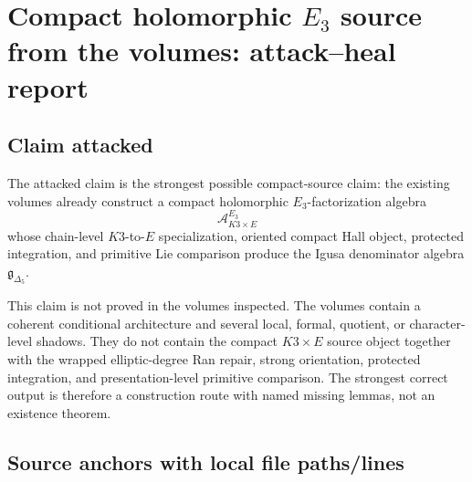 \providecommand{\Ran}{\mathrm{Ran}}
\providecommand{\Fact}{\mathsf{Fact}}
\providecommand{\Perf}{\mathrm{Perf}}
\providecommand{\CoHA}{\mathrm{CoHA}}
\providecommand{\Prim}{\mathrm{Prim}}
\providecommand{\sdim}{\mathrm{sdim}}
\providecommand{\Spch}{\mathrm{Sp}^{\mathrm{ch}}}
\providecommand{\PhiFA}{\Phi^{\mathrm{FA}}}
\providecommand{\hCS}{\mathrm{hCS}}
\providecommand{\gDelta}{\mathfrak g_{\Delta_5}}

\section{Compact holomorphic \(E_3\) source from the volumes: attack--heal report}

\subsection{Claim attacked}

The attacked claim is the strongest possible compact-source claim:
the existing volumes already construct a compact holomorphic
\(E_3\)-factorization algebra
\[
        \mathcal A^{E_3}_{K3\times E}
\]
whose chain-level \(K3\)-to-\(E\) specialization, oriented compact
Hall object, protected integration, and primitive Lie comparison
produce the Igusa denominator algebra \(\gDelta\).

This claim is not proved in the volumes inspected.  The volumes contain
a coherent conditional architecture and several local, formal, quotient,
or character-level shadows.  They do not contain the compact
\(K3\times E\) source object together with the wrapped elliptic-degree
Ran repair, strong orientation, protected integration, and
presentation-level primitive comparison.  The strongest correct output
is therefore a construction route with named missing lemmas, not an
existence theorem.

\subsection{Source anchors with local file paths/lines}

